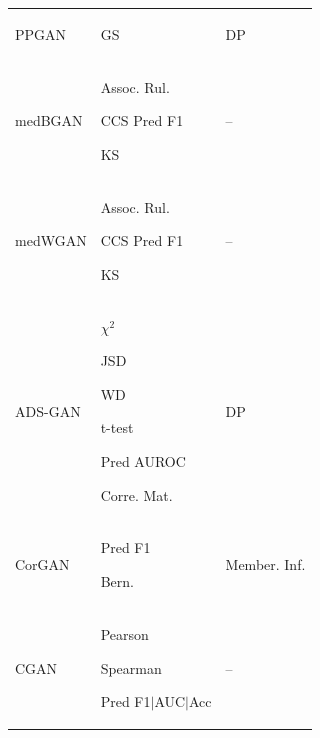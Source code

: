 \begin{landscape}
\begin{table}[htbp]
\begin{tabular}{p{26mm} p{84mm} p{60mm}}
PPGAN &	\begin{enumerate*} \item GS \end{enumerate*}	& DP \\

medBGAN	& \begin{enumerate*}  \item Assoc. Rul.
 \item  CCS Pred F1
\item KS
 \end{enumerate*}	& -- \\

medWGAN	& \begin{enumerate*} \item Assoc. Rul.\item  CCS Pred F1 \item KS \end{enumerate*} & -- \\

ADS-GAN &  \begin{enumerate*} \item $\chi^{2}$ \item JSD \item WD
\item t-test \item Pred AUROC\newline
\item Corre. Mat. \end{enumerate*}	& DP \\

CorGAN &	\begin{enumerate*} \item Pred F1 \item Bern. \end{enumerate*}
 &	Member. Inf. \\

CGAN &	\begin{enumerate*} \item Pearson
\item Spearman \item Pred F1$\vert$AUC$\vert$Acc \end{enumerate*}  &	-- \\


\end{tabular}
\end{table}
\end{landscape}
